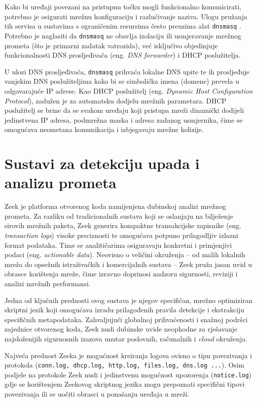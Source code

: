 Kako bi uređaji povezani na pristupnu točku mogli funkcionalno komunicirati, potrebno je osigurati mrežnu konfiguraciju i razlučivanje naziva. Ulogu pružanja tih servisa u sustavima s ograničenim 
resursima često preuzima alat \texttt{dnsmasq} \cite{dnsmasq_docs}. Potrebno je naglasiti da \texttt{dnsmasq} ne obavlja izolaciju ili usmjeravanje mrežnog prometa (što je primarni zadatak vatrozida), 
već isključivo objedinjuje funkcionalnosti DNS prosljeđivača (eng. \textit{DNS forwarder}) i DHCP poslužitelja.

U ulozi DNS prosljeđivača, \lstinline|dnsmasq| prihvaća lokalne DNS upite te ih prosljeđuje vanjskim DNS poslužiteljima kako bi se simbolička imena (domene) prevela u odgovarajuće IP adrese. Kao DHCP 
poslužitelj (eng. \textit{Dynamic Host Configuration Protocol}), zadužen je za automatsku dodjelu mrežnih parametara. DHCP poslužitelj se brine da se svakom uređaju koji pristupa mreži dinamički dodijeli 
jedinstvena IP adresa, podmrežna maska i adresa zadanog usmjernika, čime se omogućava neometana komunikacija i izbjegavaju mrežne kolizije.

\section{Sustavi za detekciju upada i analizu prometa}
Zeek je platforma otvorenog koda namijenjena dubinskoj analizi mrežnog prometa. Za razliku od tradicionalnih sustava koji se oslanjaju na bilježenje sirovih mrežnih paketa, Zeek generira 
kompaktne transakcijske zapisnike (eng. \textit{transaction logs}) visoke preciznosti te omogućava potpuno prilagodljiv izlazni format podataka. Time se analitičarima osiguravaju konkretni i primjenjivi 
podaci (eng. \textit{actionable data}). Neovisno o veličini okruženja -- od malih lokalnih mreža do opsežnih istraživačkih i komercijalnih sustava -- Zeek pruža jasan uvid u obrasce korištenja mreže, 
čime izravno doprinosi nadzoru sigurnosti, reviziji i analizi mrežnih performansi.

Jedna od ključnih prednosti ovog sustava je njegov specifičan, mrežno optimiziran skriptni jezik koji omogućava izradu prilagođenih pravila detekcije i ekstrakciju specifičnih metapodataka. Zahvaljujući 
globalnoj prihvaćenosti i snažnoj podršci zajednice otvorenog koda, Zeek nudi dubinske uvide neophodne za rješavanje najsloženijih sigurnosnih izazova unutar poslovnih, računalnih i \textit{cloud} 
okruženja.

Najveća prednost Zeeka je mogućnost kreiranja logova ovisno o tipu povezivanja i protokola (\texttt{conn.log, dhcp.log, http.log, files.log, dns.log ...}). Osim podjele na protokole Zeek nudi i jedinstvenu 
mogućnost upozorenja (\texttt{notice.log}) gdje se korištenjem Zeekovog skriptnog jezika mogu prepoznati specifični tipovi povezivanja ili se uočiti obrasci u ponašanju uređaja u mreži.

